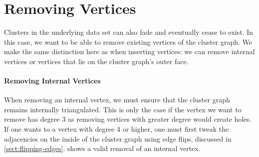 \section{Removing Vertices}
\label{sect:removing-vertices}

Clusters in the underlying data set can also fade and eventually cease to exist. In this case, we want to be able to remove existing vertices of the cluster graph. We make the same distinction here as when inserting vertices: we can remove internal vertices or vertices that lie on the cluster graph's outer face. 



\paragraph{Removing Internal Vertices}

When removing an internal vertex, we must ensure that the cluster graph remains internally triangulated. This is only the case if the vertex we want to remove has degree 3 as removing vertices with greater degree would create holes. If one wants to a vertex with degree 4 or higher, one must first tweak the adjacencies on the inside of the cluster graph using edge flips, discussed in \cref{sect:flipping-edges}.  shows a valid removal of an internal vertex.

